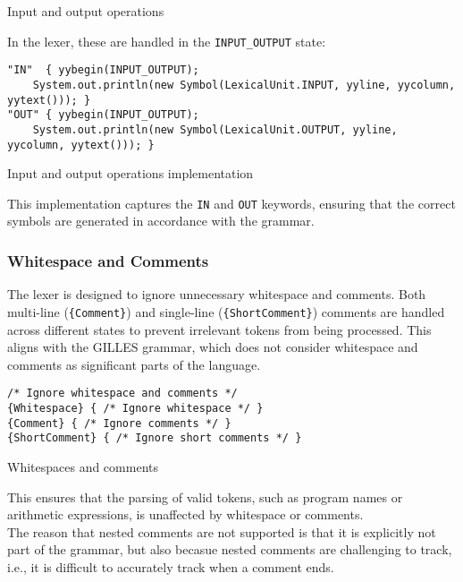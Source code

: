      \begin{table}[h]
		\centering
		\caption{Input and output operations}
	\end{table}

	In the lexer, these are handled in the \texttt{INPUT\_OUTPUT} state:

	\begin{verbatim}
"IN"  { yybegin(INPUT_OUTPUT);
    System.out.println(new Symbol(LexicalUnit.INPUT, yyline, yycolumn, yytext())); }
"OUT" { yybegin(INPUT_OUTPUT);
    System.out.println(new Symbol(LexicalUnit.OUTPUT, yyline, yycolumn, yytext())); }
	\end{verbatim}

    \begin{table}[h]
		\centering
		\caption{Input and output operations implementation}
	\end{table}

	This implementation captures the \texttt{IN} and \texttt{OUT} keywords, ensuring that the correct symbols are generated in accordance with the grammar.


	\subsubsection{Whitespace and Comments}
	The lexer is designed to ignore unnecessary whitespace and comments. Both multi-line (\texttt{\{Comment\}}) and single-line (\texttt{\{ShortComment\}}) comments are handled across different states to prevent irrelevant tokens from being processed. This aligns with the GILLES grammar, which does not consider whitespace and comments as significant parts of the language.

	\begin{verbatim}
/* Ignore whitespace and comments */
{Whitespace} { /* Ignore whitespace */ }
{Comment} { /* Ignore comments */ }
{ShortComment} { /* Ignore short comments */ }
	\end{verbatim}

    \begin{table}[h]
		\centering
		\caption{Whitespaces and comments}
	\end{table}

	This ensures that the parsing of valid tokens, such as program names or arithmetic expressions, is unaffected by whitespace or comments.\\
	The reason that nested comments are not supported is that it is explicitly not part of the grammar, but also becasue nested comments are challenging to track, i.e., it
	is difficult to accurately track when a comment ends.\\

